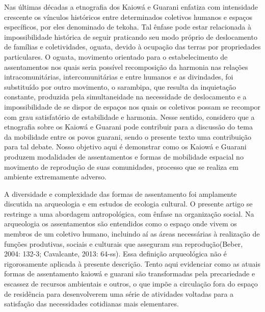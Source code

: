 Nas últimas décadas a etnografia dos Kaiowá e Guarani enfatiza com
intensidade crescente os vínculos históricos entre determinados
coletivos humanos e espaços específicos, por eles denominado de tekoha.
Tal ênfase pode estar relacionada à impossibilidade histórica de seguir
praticando seu modo próprio de deslocamento de famílias e
coletividades, oguata, devido à ocupação das terras por propriedades
particulares. O oguata, movimento orientado para o estabelecimento de
assentamentos nos quais seria possível recomposição da harmonia nas
relações intracomunitárias, intercomunitárias e entre humanos e as
divindades, foi substituído por outro movimento, o sarambipa, que
resulta da inquietação constante, produzida pela simultaneidade na
necessidade de deslocamento e a impossibilidade de se dispor de espaços
nos quais os coletivos possam se recompor com grau satisfatório de
estabilidade e harmonia. Nesse sentido, considero que a etnografia
sobre os Kaiowá e Guarani pode contribuir para a discussão do tema da
mobilidade entre os povos guarani, sendo o presente texto uma
contribuição para tal debate. Nosso objetivo aqui é demonstrar como os
Kaiowá e Guarani produzem modalidades de assentamentos e formas de
mobilidade espacial no movimento de reprodução de suas comunidades,
processo que se realiza em ambiente extremamente adverso.

A diversidade e complexidade das formas de assentamento foi amplamente
discutida na arqueologia e em estudos de ecologia cultural. O presente
artigo se restringe a uma abordagem antropológica, com ênfase na
organização social. Na arqueologia os assentamentos são entendidos como
o espaço onde vivem os membros de um coletivo humano, incluindo aí as
áreas necessárias à realização de funções produtivas, sociais e
culturais que asseguram sua reprodução(Beber, 2004: 132-3; 
Cavalcante, 2013: 64-ss). Essa definição
arqueológica não é rigorosamente aplicada à presente descrição. Tento
aqui evidenciar como as atuais formas de assentamento kaiowá e guarani
são transformadas pela precariedade e escassez de recursos ambientais e
outros, o que impõe a circulação fora do espaço de residência para
desenvolverem uma série de atividades voltadas para a satisfação das
necessidades cotidianas mais elementares. 

